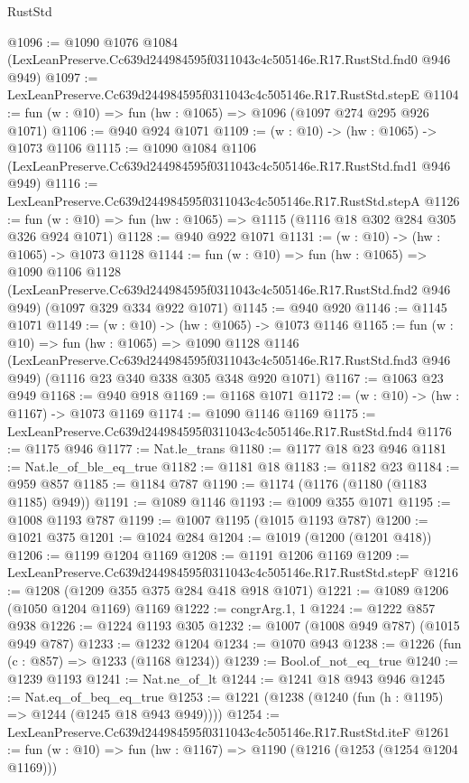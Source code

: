 \begin{lexlean}{RustStd}
\begin{coremodule}
@1096 := @1090
    @1076
    @1084
    (LexLeanPreserve.Cc639d244984595f0311043c4c505146e.R17.RustStd.fnd0 @946 @949)
@1097 := LexLeanPreserve.Cc639d244984595f0311043c4c505146e.R17.RustStd.stepE
@1104 := fun (w : @10) => fun (hw : @1065) => @1096 (@1097 @274 @295 @926 @1071)
@1106 := @940 @924 @1071
@1109 := (w : @10) -> (hw : @1065) -> @1073 @1106
@1115 := @1090
    @1084
    @1106
    (LexLeanPreserve.Cc639d244984595f0311043c4c505146e.R17.RustStd.fnd1 @946 @949)
@1116 := LexLeanPreserve.Cc639d244984595f0311043c4c505146e.R17.RustStd.stepA
@1126 := fun (w : @10) => fun (hw : @1065) => @1115 (@1116 @18 @302 @284 @305 @326 @924 @1071)
@1128 := @940 @922 @1071
@1131 := (w : @10) -> (hw : @1065) -> @1073 @1128
@1144 := fun (w : @10) =>
  fun (hw : @1065) =>
  @1090
    @1106
    @1128
    (LexLeanPreserve.Cc639d244984595f0311043c4c505146e.R17.RustStd.fnd2 @946 @949)
    (@1097 @329 @334 @922 @1071)
@1145 := @940 @920
@1146 := @1145 @1071
@1149 := (w : @10) -> (hw : @1065) -> @1073 @1146
@1165 := fun (w : @10) =>
  fun (hw : @1065) =>
  @1090
    @1128
    @1146
    (LexLeanPreserve.Cc639d244984595f0311043c4c505146e.R17.RustStd.fnd3 @946 @949)
    (@1116 @23 @340 @338 @305 @348 @920 @1071)
@1167 := @1063 @23 @949
@1168 := @940 @918
@1169 := @1168 @1071
@1172 := (w : @10) -> (hw : @1167) -> @1073 @1169
@1174 := @1090 @1146 @1169
@1175 := LexLeanPreserve.Cc639d244984595f0311043c4c505146e.R17.RustStd.fnd4
@1176 := @1175 @946
@1177 := Nat.le_trans
@1180 := @1177 @18 @23 @946
@1181 := Nat.le_of_ble_eq_true
@1182 := @1181 @18
@1183 := @1182 @23
@1184 := @959 @857
@1185 := @1184 @787
@1190 := @1174 (@1176 (@1180 (@1183 @1185) @949))
@1191 := @1089 @1146
@1193 := @1009 @355 @1071
@1195 := @1008 @1193 @787
@1199 := @1007 @1195 (@1015 @1193 @787)
@1200 := @1021 @375
@1201 := @1024 @284
@1204 := @1019 (@1200 (@1201 @418))
@1206 := @1199 @1204 @1169
@1208 := @1191 @1206 @1169
@1209 := LexLeanPreserve.Cc639d244984595f0311043c4c505146e.R17.RustStd.stepF
@1216 := @1208 (@1209 @355 @375 @284 @418 @918 @1071)
@1221 := @1089 @1206 (@1050 @1204 @1169) @1169
@1222 := congrArg.{1, 1}
@1224 := @1222 @857 @938
@1226 := @1224 @1193 @305
@1232 := @1007 (@1008 @949 @787) (@1015 @949 @787)
@1233 := @1232 @1204
@1234 := @1070 @943
@1238 := @1226 (fun (c : @857) => @1233 (@1168 @1234))
@1239 := Bool.of_not_eq_true
@1240 := @1239 @1193
@1241 := Nat.ne_of_lt
@1244 := @1241 @18 @943 @946
@1245 := Nat.eq_of_beq_eq_true
@1253 := @1221 (@1238 (@1240 (fun (h : @1195) => @1244 (@1245 @18 @943 @949))))
@1254 := LexLeanPreserve.Cc639d244984595f0311043c4c505146e.R17.RustStd.iteF
@1261 := fun (w : @10) => fun (hw : @1167) => @1190 (@1216 (@1253 (@1254 @1204 @1169)))

\end{coremodule}
\end{lexlean}
